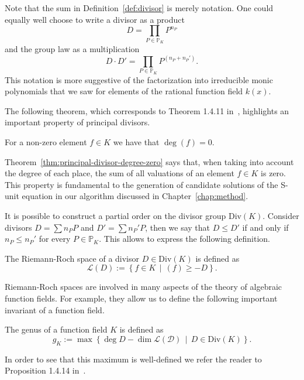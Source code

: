 Note that the sum in Definition~\ref{def:divisor} is merely notation. One could equally well choose to write a divisor as a product
\[D = \prod_{P \in \mathbb{P}_{K}} P^{n_{P}}\]
and the group law as a multiplication
\[D \cdot D' = \prod_{P \in \mathbb{P}_{K}} P^{\left(n_{P} + n_{P}'\right)}.\]
This notation is more suggestive of the factorization into irreducible monic polynomials that we saw for elements of the rational function field \(k(x)\).

The following theorem, which corresponds to Theorem 1.4.11 in~\cite{stichtenoth-2009-algebraic-function-fields}, highlights an important property of principal divisors.

\begin{theorem}%
  \label{thm:principal-divisor-degree-zero}
  For a non-zero element \(f \in K\) we have that \(\deg{(f)} = 0\).
\end{theorem}

Theorem~\ref{thm:principal-divisor-degree-zero} says that, when taking into account the degree of each place, the sum of all valuations of an element \(f \in K\) is zero. This property is fundamental to the generation of candidate solutions of the S-unit equation in our algorithm discussed in Chapter~\ref{chap:method}.

It is possible to construct a partial order on the divisor group \(\mathrm{Div}(K)\). Consider divisors \({D = \sum n_{P}P}\) and \({D' = \sum n_{P}'P}\), then we say that \(D \leq D'\) if and only if \(n_{P} \leq n_{P}'\) for every \(P \in \mathbb{P}_{K}\). This allows to express the following definition.

\begin{definition}%
  \label{def:riemann-roch-space}
  The Riemann-Roch space of a divisor \(D \in \mathrm{Div}(K)\) is defined as
  \[\mathcal{L}(D) := \left\{ f \in K \,\middle|\, (f) \geq -D \right\}.\]
\end{definition}

Riemann-Roch spaces are involved in many aspects of the theory of algebraic function fields. For example, they allow us to define the following important invariant of a function field.

\begin{definition}%
  \label{def:genus}
  The genus of a function field \(K\) is defined as
  \[g_{K} := \max{\left\{ \deg{D} - \dim{\mathcal{L(D)}} \,\middle|\, D \in \mathrm{Div}(K) \right\}}.\]
\end{definition}

In order to see that this maximum is well-defined we refer the reader to Proposition 1.4.14 in~\cite{stichtenoth-2009-algebraic-function-fields}.

